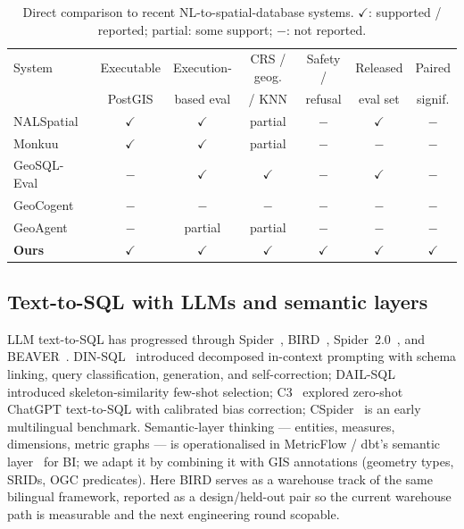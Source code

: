 \documentclass[11pt]{article}
\begin{document}
\begin{table}[t]\centering\footnotesize
\caption{Direct comparison to recent NL-to-spatial-database systems.
$\checkmark$: supported / reported; partial: some support; $-$: not reported.}
\label{tab:related-comp}
\begin{tabular}{@{}lcccccc@{}}
\toprule
System & Executable & Execution- & CRS / geog. & Safety / & Released & Paired \\
       & PostGIS    & based eval & / KNN       & refusal  & eval set & signif. \\
\midrule
NALSpatial~\cite{liu2025nalspatial}    & $\checkmark$ & $\checkmark$ & partial      & $-$           & $\checkmark$ & $-$           \\
Monkuu~\cite{yu2025monkuu}             & $\checkmark$ & $\checkmark$ & partial      & $-$           & $-$           & $-$           \\
GeoSQL-Eval~\cite{hou2026geosql}       & $-$           & $\checkmark$ & $\checkmark$ & $-$           & $\checkmark$ & $-$           \\
GeoCogent~\cite{houcoding2025}         & $-$           & $-$           & $-$           & $-$           & $-$           & $-$           \\
GeoAgent~\cite{lin2026geoagent}        & $-$           & partial      & partial      & $-$           & $-$           & $-$           \\
\textbf{Ours}                          & $\checkmark$ & $\checkmark$ & $\checkmark$ & $\checkmark$ & $\checkmark$ & $\checkmark$ \\
\bottomrule
\end{tabular}
\end{table}

\subsection{Text-to-SQL with LLMs and semantic layers}

LLM text-to-SQL has progressed through Spider~\cite{yu2018spider,rajkumar2022evaluating}, BIRD~\cite{li2023bird}, Spider~2.0~\cite{lei2025spider2}, and BEAVER~\cite{chen2024beaver}. DIN-SQL~\cite{pourreza2023dinsql} introduced decomposed in-context prompting with schema linking, query classification, generation, and self-correction; DAIL-SQL~\cite{gao2024dail} introduced skeleton-similarity few-shot selection; C3~\cite{dong2023c3} explored zero-shot ChatGPT text-to-SQL with calibrated bias correction; CSpider~\cite{min2019cspider} is an early multilingual benchmark. Semantic-layer thinking --- entities, measures, dimensions, metric graphs --- is operationalised in MetricFlow / dbt's semantic layer~\cite{metricflow} for BI; we adapt it by combining it with GIS annotations (geometry types, SRIDs, OGC predicates). Here BIRD serves as a warehouse track of the same bilingual framework, reported as a design/held-out pair so the current warehouse path is measurable and the next engineering round scopable.
\end{document}
